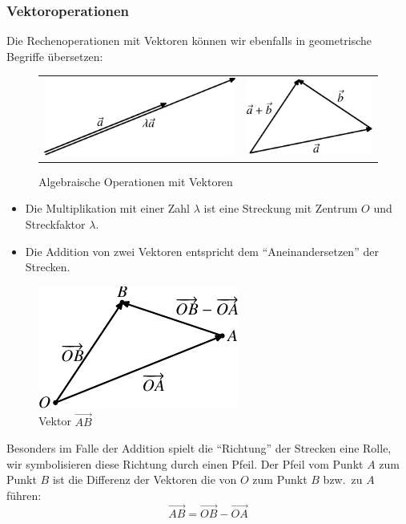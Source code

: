 \subsubsection{Vektoroperationen}
Die Rechenoperationen mit Vektoren können wir ebenfalls in geometrische
Begriffe übersetzen:
\begin{figure}
\begin{center}
\begin{tabular}{cc}
\includegraphics{images/v-2}&
\includegraphics{images/v-3}
\end{tabular}
\end{center}
\caption{Algebraische Operationen mit Vektoren\label{image-vektor-operationen}}
\end{figure}
\begin{itemize}
\item Die Multiplikation mit einer Zahl $\lambda$ ist eine Streckung mit
Zentrum $O$ und Streckfaktor $\lambda$.
\item Die Addition von zwei Vektoren entspricht dem ``Aneinandersetzen''
der Strecken.
\end{itemize}
\begin{figure}
\begin{center}
\includegraphics{images/v-4}
\end{center}
\caption{Vektor $\overset{\rightarrow}{AB}$
\label{image-vektorab}}
\end{figure}
Besonders im Falle der Addition spielt die ``Richtung'' der Strecken eine
Rolle, wir symbolisieren diese Richtung durch einen Pfeil.
Der Pfeil vom Punkt $A$ zum Punkt $B$ ist die Differenz der Vektoren die von
$O$ zum Punkt $B$ bzw.~zu $A$ führen:
\[
\overset{\rightarrow}{AB}=\overset{\rightarrow}{OB}-\overset{\rightarrow}{OA}
\]

